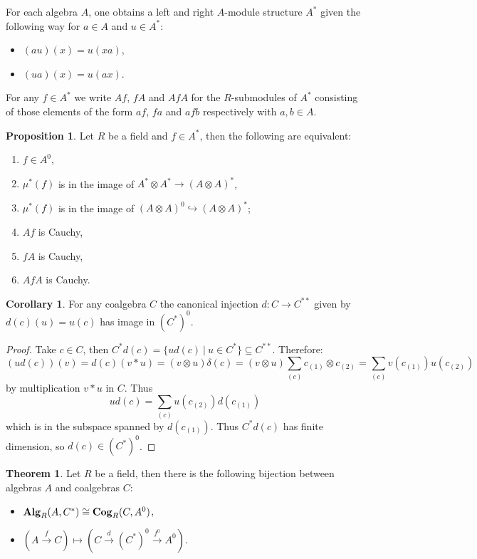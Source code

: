 \documentclass[8pt]{article}
\theoremstyle{definition}
\theoremstyle{definition}
\newtheorem{theorem}{Theorem}[section]
\theoremstyle{definition}
\theoremstyle{definition}
\theoremstyle{definition}
\theoremstyle{definition}
\theoremstyle{definition}
\newtheorem{prop}{Proposition}[section]
\theoremstyle{definition}
\theoremstyle{definition}
\theoremstyle{definition}
\theoremstyle{definition}
\theoremstyle{definition}
\theoremstyle{definition}
\theoremstyle{definition}
\newtheorem{col}{Corollary}[section]
\theoremstyle{question}
\begin{document}
For each algebra $A$, one obtains a left and right $A$-module structure $A^*$ given the following
way for $a \in A$ and $u \in A^*$:
\begin{itemize}
  \item $(a u)(x) = u (x a)$,
  \item $(u a)(x) = u (a x)$.
\end{itemize}
For any $f \in A^*$ we write $A f$, $f A$ and $A f A$ for the $R$-submodules of $A^*$
consisting of those elements of the form $a f$, $f a$ and $a f b$ respectively with $a, b \in A$.

\begin{prop} Let $R$ be a field and $f \in A^*$, then the following are equivalent:
  \begin{enumerate}
    \item $f \in A^0$,
    \item $\mu^*(f)$ is in the image of $A^* \otimes A^* \to (A \otimes A)^*$,
    \item $\mu^*(f)$ is in the image of $(A \otimes A)^0 \hookrightarrow (A \otimes A)^*$;
    \item $A f$ is Cauchy,
    \item $f A$ is Cauchy,
    \item $A f A$ is Cauchy.
  \end{enumerate}
\end{prop}

\begin{col}
  For any coalgebra $C$ the canonical injection $d : C \to C^{**}$ given by 
  $d(c)(u) = u(c)$ has image in $(C^*)^0$.
\end{col}

\begin{proof}
  Take $c \in C$, then $C^*d(c) = \{ u d(c) \: | \: u \in C^*\} \subseteq C^{**}$.
  Therefore:
  \[
  (u d(c))(v) = d(c)(v * u) = (v \otimes u) \delta(c) = (v \otimes u) \sum \limits_{(c)} c_{(1)} \otimes c_{(2)} = \sum \limits_{(c)} v(c_{(1)}) u(c_{(2)})
  \]
  by multiplication $v * u$ in $C$. Thus
  \[
  u d(c) = \sum \limits_{(c)} u(c_{(2)}) d(c_{(1)})
  \]
  which is in the subspace spanned by $d(c_{(1)})$. Thus $C^* d(c)$ has finite dimension, 
  so $d(c) \in (C^*)^0$.
\end{proof}

\begin{theorem}
  Let $R$ be a field, then there is the following bijection between algebras $A$ and coalgebras $C$:
  \begin{itemize}
    \item ${\bf Alg}_R(A, C^*) \cong {\bf Cog}_R(C, A^0)$,
    \item $(A \xrightarrow{f} C) \mapsto (C \xrightarrow{d} (C^*)^0 \xrightarrow{f^0} A^0).$
  \end{itemize}
\end{theorem}
\end{document}
